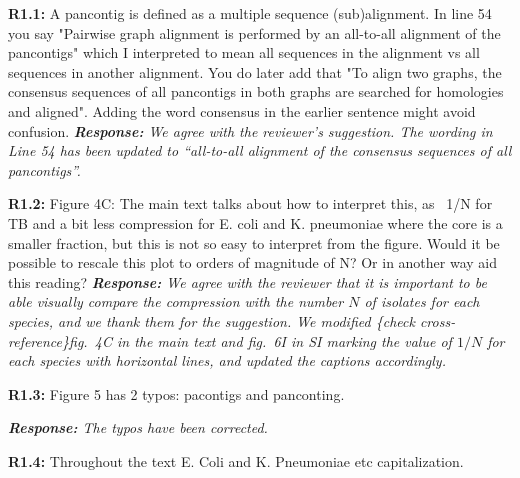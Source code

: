 \documentclass[aps,rmp,onecolumn]{revtex4-1}
\newcommand{\Marco}[1]{{\color{gray}Marco: #1}}
\newcommand{\Liam}[1]{{\color{teal}Liam: #1}}
\newcommand{\reviewer}[2]{\textbf{#1:} #2\vskip 5mm}
\newcommand{\response}[1]{{\it {\color{response}\textbf{Response:} #1}}\vskip 5mm}
\newcommand{\crossref}[1]{{\color{purple}\{check cross-reference\}#1}} %
\begin{document}
\reviewer{R1.1}{A pancontig is defined as a multiple sequence (sub)alignment. In line 54 you say "Pairwise graph alignment is performed by an all-to-all alignment of the pancontigs" which I interpreted to mean all sequences in the alignment vs all sequences in another alignment. You do later add that "To align two graphs, the consensus sequences of all pancontigs in both graphs are searched for homologies and aligned". Adding the word consensus in the earlier sentence might avoid confusion.}
\response{We agree with the reviewer's suggestion. The wording in Line 54 has been updated to ``all-to-all alignment of the consensus sequences of all \textit{pancontigs}''.}

\reviewer{R1.2}{Figure 4C: The main text talks about how to interpret this, as ~1/N for TB and a bit less compression for E. coli and K. pneumoniae where the core is a smaller fraction, but this is not so easy to interpret from the figure. Would it be possible to rescale this plot to orders of magnitude of N? Or in another way aid this reading?}
\response{We agree with the reviewer that it is important to be able visually compare the compression with the number $N$ of isolates for each species, and we thank them for the suggestion. We modified \crossref{fig.~4C in the main text and fig.~6I in SI} marking the value of $1/N$ for each species with horizontal lines, and updated the captions accordingly.}

\reviewer{R1.3}{Figure 5 has 2 typos: pacontigs and panconting.}

\response{The typos have been corrected.}

\reviewer{R1.4}{Throughout the text E. Coli and K. Pneumoniae etc capitalization.}
\end{document}

